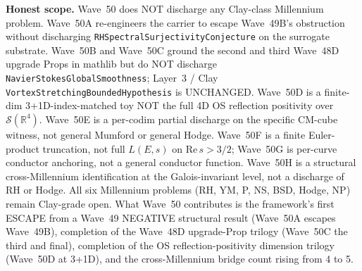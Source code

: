 \begin{remark}
\textbf{Honest scope.} Wave~50 does NOT discharge any Clay-class Millennium problem. Wave~50A re-engineers the carrier to escape Wave~49B's obstruction without discharging \texttt{RHSpectralSurjectivityConjecture} on the surrogate substrate. Wave~50B and Wave~50C ground the second and third Wave~48D upgrade Props in mathlib but do NOT discharge \texttt{NavierStokesGlobalSmoothness}; Layer~3 / Clay \texttt{VortexStretchingBoundedHypothesis} is UNCHANGED. Wave~50D is a finite-dim 3+1D-index-matched toy NOT the full 4D OS reflection positivity over $\mathcal{S}(\mathbb{R}^4)$. Wave~50E is a per-codim partial discharge on the specific CM-cube witness, not general Mumford or general Hodge. Wave~50F is a finite Euler-product truncation, not full $L(E, s)$ on $\mathrm{Re}\,s > 3/2$; Wave~50G is per-curve conductor anchoring, not a general conductor function. Wave~50H is a structural cross-Millennium identification at the Galois-invariant level, not a discharge of RH or Hodge. All six Millennium problems (RH, YM, P, NS, BSD, Hodge, NP) remain Clay-grade open. What Wave~50 contributes is the framework's first ESCAPE from a Wave~49 NEGATIVE structural result (Wave~50A escapes Wave~49B), completion of the Wave~48D upgrade-Prop trilogy (Wave~50C the third and final), completion of the OS reflection-positivity dimension trilogy (Wave~50D at 3+1D), and the cross-Millennium bridge count rising from 4 to 5.
\end{remark}


